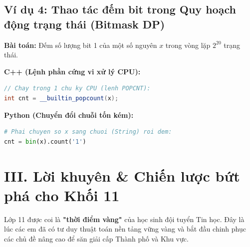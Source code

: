 \documentclass[11pt,a4paper]{article}
\begin{document}
\subsection*{\color{AsianBlue}\normalsize Ví dụ 4: Thao tác đếm bit trong Quy hoạch động trạng thái (Bitmask DP)}
\textbf{Bài toán:} Đếm số lượng bit 1 của một số nguyên $x$ trong vòng lặp $2^{20}$ trạng thái.

\noindent
\begin{minipage}[t]{0.48\textwidth}
\textbf{\color{AsianDarkBlue}C++ (Lệnh phần cứng vi xử lý CPU):}
\begin{lstlisting}[style=codeC,language=C++]
// Chay trong 1 chu ky CPU (lenh POPCNT):
int cnt = __builtin_popcount(x);
\end{lstlisting}
\end{minipage}
\hfill
\begin{minipage}[t]{0.48\textwidth}
\textbf{\color{orange!80!black}Python (Chuyển đổi chuỗi tốn kém):}
\begin{lstlisting}[style=codePy,language=Python]
# Phai chuyen so x sang chuoi (String) roi dem:
cnt = bin(x).count('1')
\end{lstlisting}
\end{minipage}

\newpage

\section*{\color{AsianDarkBlue}\large III. Lời khuyên \& Chiến lược bứt phá cho Khối 11}

Lớp 11 được coi là \textbf{"thời điểm vàng"} của học sinh đội tuyển Tin học. Đây là lúc các em đã có tư duy thuật toán nền tảng vững vàng và bắt đầu chinh phục các chủ đề nâng cao để săn giải cấp Thành phố và Khu vực.
\end{document}
